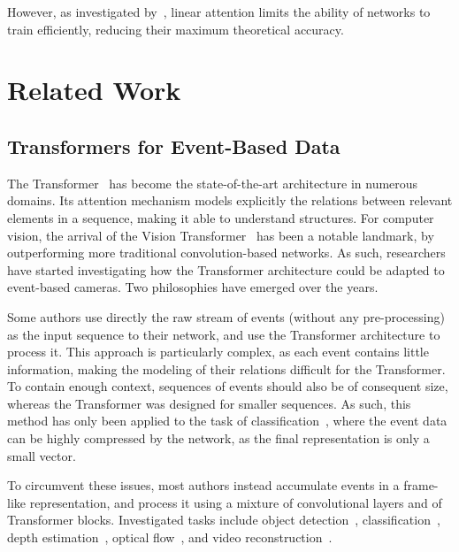 However, as investigated by~\cite{Narang2021DoTM,Tay2022ScalingLV}, linear attention limits the ability of networks to train efficiently, reducing their maximum theoretical accuracy.

\section{Related Work}\label{sec:delta:sota}

\subsection{Transformers for Event-Based Data}
The Transformer~\cite{Vaswani2017AttentionIA} has become the state-of-the-art architecture in numerous domains. Its attention mechanism models explicitly the relations between relevant elements in a sequence, making it able to understand structures. For computer vision, the arrival of the Vision Transformer~\cite{Dosovitskiy2020AnII} has been a notable landmark, by outperforming more traditional convolution-based networks. As such, researchers have started investigating how the Transformer architecture could be adapted to event-based cameras. Two philosophies have emerged over the years.
\begin{enumerate*}[label=\textbf{(\arabic*)}]
  \item Some authors use directly the raw stream of events (without any pre-processing) as the input sequence to their network, and use the Transformer architecture to process it. This approach is particularly complex, as each event contains little information, making the modeling of their relations difficult for the Transformer. To contain enough context, sequences of events should also be of consequent size, whereas the Transformer was designed for smaller sequences. As such, this method has only been applied to the task of classification~\cite{Kamal2023AssociativeMA,Li2022EventT}, where the event data can be highly compressed by the network, as the final representation is only a small vector.
  \item To circumvent these issues, most authors instead accumulate events in a frame-like representation, and process it using a mixture of convolutional layers and of Transformer blocks. Investigated tasks include object detection~\cite{Gehrig2022RecurrentVT}, classification~\cite{Sabater2022EventTA+,Wang2022ExploitingSS,Sabater2022EventTA}, depth estimation~\cite{Sabater2022EventTA+}, optical flow~\cite{Tian2022EventTF}, and video reconstruction~\cite{Weng2021EventbasedVR}.
\end{enumerate*}

